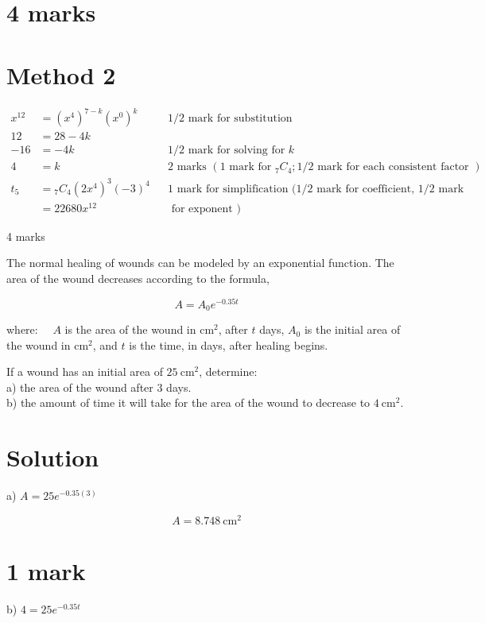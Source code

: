 \documentclass[10pt]{article}
\begin{document}
\section*{4 marks}
\section*{Method 2}
$$
\begin{aligned}
x^{12} & =\left(x^{4}\right)^{7-k}\left(x^{0}\right)^{k} & & 1 / 2 \text { mark for substitution } \\
12 & =28-4 k & & \\
-16 & =-4 k & & 1 / 2 \text { mark for solving for } k \\
4 & =k & & 2 \text { marks }\left(1 \text { mark for }{ }_{7} C_{4} ; 1 / 2 \text { mark for each consistent factor }\right) \\
t_{5} & ={ }_{7} C_{4}\left(2 x^{4}\right)^{3}(-3)^{4} & & 1 \text { mark for simplification }(1 / 2 \text { mark for coefficient, } 1 / 2 \text { mark } \\
& =22680 x^{12} & & \text { for exponent })
\end{aligned}
$$

4 marks

The normal healing of wounds can be modeled by an exponential function. The area of the wound decreases according to the formula,

$$
A=A_{0} e^{-0.35 t}
$$

where: $\quad A$ is the area of the wound in $\mathrm{cm}^{2}$, after $t$ days, $A_{0}$ is the initial area of the wound in $\mathrm{cm}^{2}$, and $t$ is the time, in days, after healing begins.

If a wound has an initial area of $25 \mathrm{~cm}^{2}$, determine:\\
a) the area of the wound after 3 days.\\
b) the amount of time it will take for the area of the wound to decrease to $4 \mathrm{~cm}^{2}$.

\section*{Solution}
a) $A=25 e^{-0.35(3)}$

$$
A=8.748 \mathrm{~cm}^{2}
$$

\section*{1 mark}
b) $4=25 e^{-0.35 t}$
\end{document}
